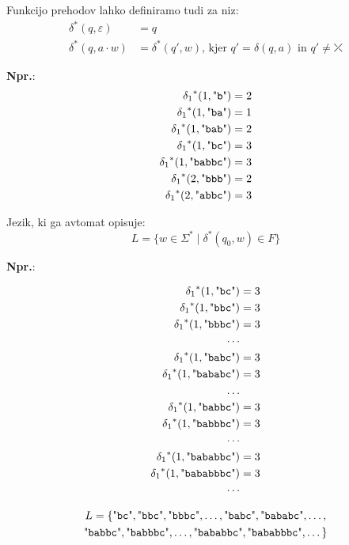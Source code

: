 \documentclass{report}
\newcommand{\Ex}{\textbf{Npr.}:\ }
\newcommand{\Str}[1]{\text{\textquotedbl\texttt{#1}\textquotedbl}}
\newcommand{\Seq}{\cdot}
\newcommand{\Kleene}[1]{{#1}^\ast}
\newcommand{\Err}{\rdiagovfdiag}
\begin{document}
Funkcijo prehodov lahko definiramo tudi za niz:
\begin{align*} %
  \Kleene{\delta}(q, \varepsilon) &= q\\
  \Kleene{\delta}(q, a \Seq w) &= \Kleene{\delta}(q', w) \text{, kjer } q' = \delta(q, a) \text{ in } q' \neq \Err
\end{align*}

\Ex
\begin{align*}
  \Kleene{\delta_1}(1, \Str{b}) &= 2 \\
  \Kleene{\delta_1}(1, \Str{ba}) &= 1 \\
  \Kleene{\delta_1}(1, \Str{bab}) &= 2 \\
  \Kleene{\delta_1}(1, \Str{bc}) &= 3 \\
  \Kleene{\delta_1}(1, \Str{babbc}) &= 3 \\
  \Kleene{\delta_1}(2, \Str{bbb}) &= 2 \\
  \Kleene{\delta_1}(2, \Str{abbc}) &= 3
\end{align*}

Jezik, ki ga avtomat opisuje:
\begin{equation*}
  L = \{w \in \Kleene{\Sigma} \mid \Kleene{\delta}(q_0, w) \in F\}
\end{equation*}

\Ex

\begin{align*}
  \Kleene{\delta_1}(1, \Str{bc}) &= 3 \\
  \Kleene{\delta_1}(1, \Str{bbc}) &= 3 \\
  \Kleene{\delta_1}(1, \Str{bbbc}) &= 3 \\
  \cdots \\
  \Kleene{\delta_1}(1, \Str{babc}) &= 3 \\
  \Kleene{\delta_1}(1, \Str{bababc}) &= 3 \\
  \ldots \\
  \Kleene{\delta_1}(1, \Str{babbc}) &= 3 \\
  \Kleene{\delta_1}(1, \Str{babbbc}) &= 3 \\
  \cdots \\
  \Kleene{\delta_1}(1, \Str{bababbc}) &= 3 \\
  \Kleene{\delta_1}(1, \Str{bababbbc}) &= 3 \\
  \cdots \\
\end{align*}

\begin{multline*}
  L = \{ \Str{bc}, \Str{bbc}, \Str{bbbc}, \ldots, \Str{babc}, \Str{bababc}, \ldots,\\
  \Str{babbc},  \Str{babbbc}, \ldots, \Str{bababbc}, \Str{bababbbc}, \dots \}
\end{multline*}
\end{document}
